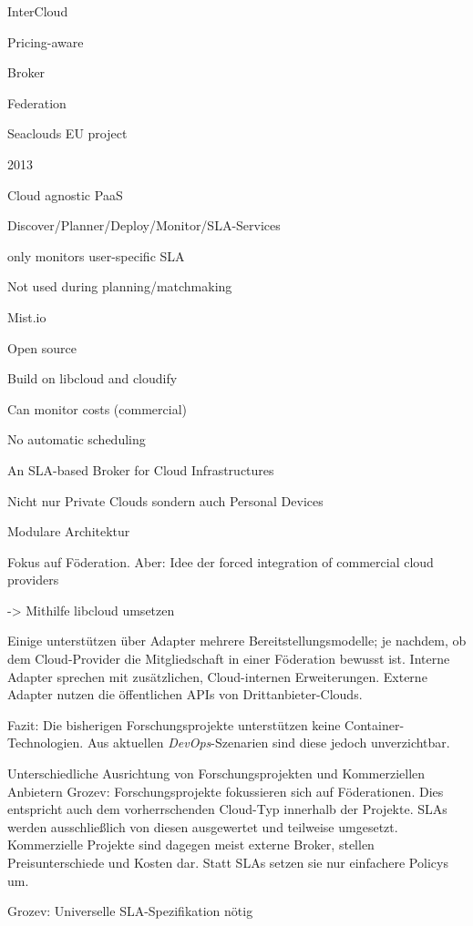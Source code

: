 InterCloud 

Pricing-aware 

Broker 

Federation 



Seaclouds EU project 

2013 

Cloud agnostic PaaS 

Discover/Planner/Deploy/Monitor/SLA-Services 

only monitors user-specific SLA 

Not used during planning/matchmaking 



Mist.io 

Open source 

Build on libcloud and cloudify 

Can monitor costs (commercial) 

No automatic scheduling 



An SLA-based Broker for Cloud Infrastructures 

Nicht nur Private Clouds sondern auch Personal Devices 

Modulare Architektur 

Fokus auf Föderation. Aber: Idee der forced integration of commercial cloud providers 

-> Mithilfe libcloud umsetzen 




Einige unterstützen über Adapter mehrere Bereitstellungsmodelle; je nachdem, ob dem Cloud-Provider die Mitgliedschaft in einer Föderation bewusst ist. Interne Adapter sprechen mit zusätzlichen, Cloud-internen Erweiterungen. Externe Adapter nutzen die öffentlichen APIs von Drittanbieter-Clouds.


Fazit: Die bisherigen Forschungsprojekte unterstützen keine Container-Technologien. Aus aktuellen \emph{DevOps}-Szenarien sind diese jedoch unverzichtbar.

Unterschiedliche Ausrichtung von Forschungsprojekten und Kommerziellen Anbietern Grozev: Forschungsprojekte fokussieren sich auf Föderationen. Dies entspricht auch dem vorherrschenden Cloud-Typ innerhalb der Projekte. SLAs werden ausschließlich von diesen ausgewertet und teilweise umgesetzt. Kommerzielle Projekte sind dagegen meist externe Broker, stellen Preisunterschiede und Kosten dar. Statt SLAs setzen sie nur einfachere Policys um.

Grozev: Universelle SLA-Spezifikation nötig


